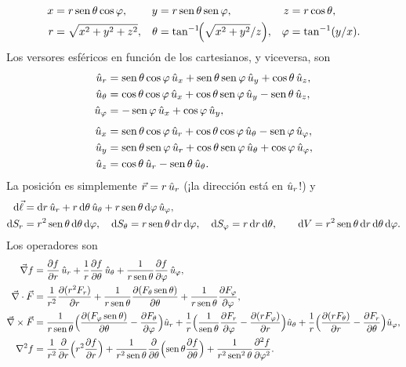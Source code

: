 
\begin{align}
  x&=r\sen\theta\cos\varphi, & y&=r\sen\theta\sen\varphi, & z&=r\cos\theta,\nonumber\\
  r&=\sqrt{x^{2}+y^{2}+z^{2}}, & \theta&=\tan^{-1}\!\Bigl(\sqrt{x^{2}+y^{2}}/z\Bigr), & \varphi&=\tan^{-1}(y/x).\nonumber
\end{align}
Los versores esféricos en función de los cartesianos, y viceversa, son
\begin{align}
  \ur&=\sen\theta\cos\varphi\,\ux+\sen\theta\sen\varphi\,\uy+\cos\theta\,\uz,\nonumber\\
  \uth&=\cos\theta\cos\varphi\,\ux+\cos\theta\sen\varphi\,\uy-\sen\theta\,\uz,\nonumber\\
  \uph&=-\sen\varphi\,\ux+\cos\varphi\,\uy,\label{eq:base-esf}\\[4pt]
  \ux&=\sen\theta\cos\varphi\,\ur+\cos\theta\cos\varphi\,\uth-\sen\varphi\,\uph,\nonumber\\
  \uy&=\sen\theta\sen\varphi\,\ur+\cos\theta\sen\varphi\,\uth+\cos\varphi\,\uph,\nonumber\\
  \uz&=\cos\theta\,\ur-\sen\theta\,\uth.\nonumber
\end{align}
La posición es simplemente $\vc{r}=r\,\ur$ (¡la dirección está en $\ur$!) y
\begin{align}
  \dl&=\dif r\,\ur+r\,\dif\theta\,\uth+r\sen\theta\,\dif\varphi\,\uph, \nonumber\\
  \dif S_r&=r^{2}\sen\theta\,\dif\theta\,\dif\varphi,\quad
  \dif S_\theta=r\sen\theta\,\dif r\,\dif\varphi,\quad
  \dif S_\varphi=r\,\dif r\,\dif\theta,\qquad
  \dV=r^{2}\sen\theta\,\dif r\,\dif\theta\,\dif\varphi .\nonumber
\end{align}
Los operadores son
\begin{align}
  \nab f&=\pd{f}{r}\,\ur+\frac{1}{r}\pd{f}{\theta}\,\uth+\frac{1}{r\sen\theta}\pd{f}{\varphi}\,\uph,\nonumber\\
  \nab\cdot\vc{F}&=\frac{1}{r^{2}}\pd{(r^{2}F_r)}{r}+\frac{1}{r\sen\theta}\pd{(F_\theta\sen\theta)}{\theta}+\frac{1}{r\sen\theta}\pd{F_\varphi}{\varphi},\nonumber\\
  \nab\times\vc{F}&=\frac{1}{r\sen\theta}\Bigl(\pd{(F_\varphi\sen\theta)}{\theta}-\pd{F_\theta}{\varphi}\Bigr)\ur
    +\frac{1}{r}\Bigl(\frac{1}{\sen\theta}\pd{F_r}{\varphi}-\pd{(rF_\varphi)}{r}\Bigr)\uth
    +\frac{1}{r}\Bigl(\pd{(rF_\theta)}{r}-\pd{F_r}{\theta}\Bigr)\uph,\label{eq:ops-esf}\\
  \Lap f&=\frac{1}{r^{2}}\pd{}{r}\Bigl(r^{2}\pd{f}{r}\Bigr)+\frac{1}{r^{2}\sen\theta}\pd{}{\theta}\Bigl(\sen\theta\pd{f}{\theta}\Bigr)+\frac{1}{r^{2}\sen^{2}\theta}\pdd{f}{\varphi}.\nonumber
\end{align}

